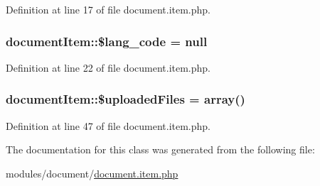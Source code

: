 Definition at line 17 of file document.\+item.\+php.

\subsubsection[{\texorpdfstring{\$lang\+\_\+code}{$lang_code}}]{\setlength{\rightskip}{0pt plus 5cm}document\+Item\+::\$lang\+\_\+code = {\bf null}}\hypertarget{classdocumentItem_a5fa7aa5d52f248116250e95126e8ab87}{}\label{classdocumentItem_a5fa7aa5d52f248116250e95126e8ab87}


Definition at line 22 of file document.\+item.\+php.

\subsubsection[{\texorpdfstring{\$uploaded\+Files}{$uploadedFiles}}]{\setlength{\rightskip}{0pt plus 5cm}document\+Item\+::\$uploaded\+Files = array()}\hypertarget{classdocumentItem_a70d4321ea0edfb6c1fb0775ced8a6b41}{}\label{classdocumentItem_a70d4321ea0edfb6c1fb0775ced8a6b41}


Definition at line 47 of file document.\+item.\+php.



The documentation for this class was generated from the following file\+:\begin{DoxyCompactItemize}
\item 
modules/document/\hyperlink{document_8item_8php}{document.\+item.\+php}\end{DoxyCompactItemize}
